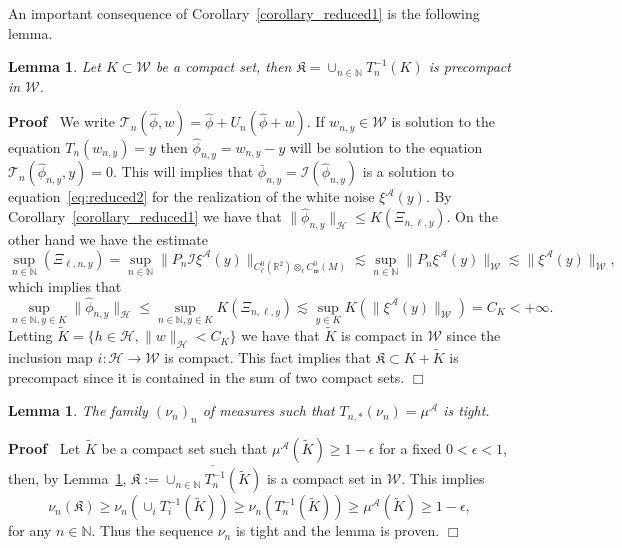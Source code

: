 \documentclass[a4paper,10pt]{article}
\newcommand{\assign}{:=}
\newcommand{\asterisk}{\mathord{*}}
\newcommand{\nobracket}{}
\newenvironment{proof}{\noindent\textbf{Proof\ }}{\hspace*{\fill}$\Box$\medskip}
\newtheorem{lemma}[theorem]{Lemma}
\begin{document}
An important consequence of Corollary~\ref{corollary_reduced1} is the
following lemma.

\begin{lemma}
  \label{lemma_reduced2}Let $K \subset \mathcal{W}$ be a compact set, then
  $\mathfrak{K} = \cup_{n \in \mathbb{N}} T^{- 1}_n (K)$ is precompact in
  $\mathcal{W}$.
\end{lemma}

\begin{proof}
  We write $\mathcal{T}_n (\hat{\phi}, w) = \hat{\phi} + U_n (\hat{\phi} + w)
  .$ If $w_{n, y} \in \mathcal{W}$ is solution to the equation $T_n  (w_{n,
  y}) = y$ then $\hat{\phi}_{n, y} = w_{n, y} - y$ will be solution to the
  equation $\mathcal{T}_n (\hat{\phi}_{n, y}, y) = 0$. This will implies that
  $\bar{\phi}_{n, y} = \mathcal{I} (\hat{\phi}_{n, y})$ is a solution to
  equation~{\eqref{eq:reduced2}} for the realization of the white noise
  $\xi^{\mathcal{A}} (y)$. By Corollary~\ref{corollary_reduced1} we have that
  $\| \hat{\phi}_{n, y} \|_{\mathcal{H}} \leqslant K (\Xi_{n, \ell, y})$. On
  the other hand we have the estimate
  \[ \sup_{n \in \mathbb{N}} (\Xi_{\ell, n, y}) = \sup_{n \in \mathbb{N}} \|
     P_n \mathcal{I} \xi^{\mathcal{A}} (y) \|_{\nobracket C^0_{\ell}
     (\mathbb{R}^2 \nobracket) \otimes_{\epsilon} C^0_{\mathfrak{w}} (M)}
     \lesssim \sup_{n \in \mathbb{N}} \| P_n \xi^{\mathcal{A}} (y)
     \|_{\mathcal{W}} \lesssim \| \xi^{\mathcal{A}} (y) \|_{\mathcal{W}}, \]
  which implies that
  \[ \sup_{n \in \mathbb{N}, y \in K} \| \hat{\phi}_{n, y} \|_{\mathcal{H}}
     \leqslant \sup_{n \in \mathbb{N}, y \in K} K (\Xi_{n, \ell, y}) \lesssim
     \sup_{y \in K} K (\| \xi^{\mathcal{A}} (y) \|_{\mathcal{W}}) = C_K < +
     \infty . \]
  Letting $\tilde{K} = \{ h \in \mathcal{H}, \| w \|_{\mathcal{H}} < C_K \}$
  we have that $\tilde{K}$ is compact in $\mathcal{W}$ since the inclusion map
  $i : \mathcal{H} \rightarrow \mathcal{W}$ is compact. This fact implies that
  $\mathfrak{K} \subset K + \tilde{K}$ is precompact since it is contained in
  the sum of two compact sets.
\end{proof}

\begin{lemma}
  \label{lemma_reduced3}The family $(\nu_n)_n$ of measures such that $T_{n,
  \asterisk} (\nu_n) = \mu^{\mathcal{A}}$ is tight.
\end{lemma}

\begin{proof}
  Let $\tilde{K}$ be a compact set such that $\mu^{\mathcal{A}} (\tilde{K})
  \geqslant 1 - \epsilon$ for a fixed $0 < \epsilon < 1$, then, by
  Lemma~\ref{lemma_reduced2}, $\mathfrak{K} \assign \overline{\cup_{n \in
  \mathbb{N}} T^{- 1}_n (\tilde{K})}$ is a compact set in $\mathcal{W}$. This
  implies
  \[ \nu_n (\mathfrak{K}) \geqslant \nu_n (\cup_i T^{- 1}_i (\tilde{K}))
     \geqslant \nu_n (T^{- 1}_n (\tilde{K})) \geqslant \mu^{\mathcal{A}}
     (\tilde{K}) \geqslant 1 - \epsilon, \]
  for any $n \in \mathbb{N}$. Thus the sequence $\nu_n$ is tight and the lemma
  is proven. 
\end{proof}
\end{document}
